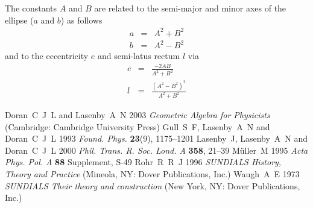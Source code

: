 \documentclass[12pt]{article}
\newcommand{\nn}{\nonumber}
\begin{document}
The constants $A$ and $B$ are related to the semi-major and minor axes of the ellipse ($a$ and $b$) as follows
%
\begin{eqnarray}
a & = & A^2 + B^2 \\ \nn
b & = & A^2 - B^2
\end{eqnarray}
%
and to the eccentricity $e$ and semi-latus rectum $l$ via
%
\begin{eqnarray}
e & = & \frac{-2AB}{A^2+B^2} \\ \nn
l & = & \frac{(A^2-B^2)^2}{A^2+B^2}
\end{eqnarray}
%
\begin{thebibliography}{10}
%
  Doran~C~J~L and Lasenby~A~N 2003 \textit{Geometric Algebra for Physicists} (Cambridge: Cambridge	University Press)
%
	Gull~S~F, Lasenby~A~N and Doran~C~J~L 1993 \textit{Found. Phys.} {\bf 23}(9), 1175--1201
%
	 Lasenby~J, Lasenby~A~N and Doran~C~J~L 2000 \textit{Phil. Trans. R. Soc. Lond. A} {\bf 358}, 21--39
%
	M\"{u}ller~M 1995 \textit{Acta Phys. Pol. A} {\bf 88} Supplement, S-49
%
  Rohr~R~R~J 1996 \textit{SUNDIALS History, Theory and Practice} (Mineola, NY: Dover Publications, Inc.)
%
  Waugh~A~E 1973 \textit{SUNDIALS Their theory and construction} (New York, NY: Dover Publications, Inc.)
%
\end{thebibliography}
%
\end{document}
